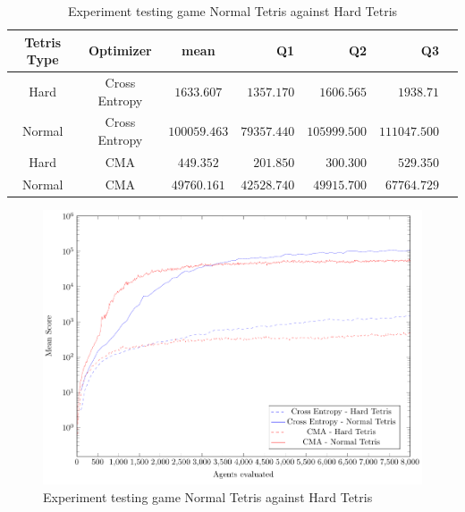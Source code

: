\clearpage


\begin{table}[H]
\centering
\small
\begin{tabular}{c c c r r r r}
Tetris Type & Optimizer & mean & Q1 & Q2 & Q3\\
\hline
Hard & Cross Entropy & $1633.607$ & $1357.170$ & $1606.565$ & $1938.71$\\
Normal & Cross Entropy & $100059.463$ & $79357.440$ & $105999.500$ & $111047.500$\\
Hard & CMA & $449.352$ & $201.850$ & $300.300$ & $529.350$\\
Normal & CMA & $49760.161$ & $42528.740$ & $49915.700$ & $67764.729$\\
\end{tabular}
\caption{Experiment testing game Normal Tetris against Hard Tetris}
\end{table}

\begin{figure}[H]
\centering
\includegraphics[scale=1]{data/complexity/mean/PlotFile.pdf}
\caption{Experiment testing game Normal Tetris against Hard Tetris}
\end{figure}


\clearpage

